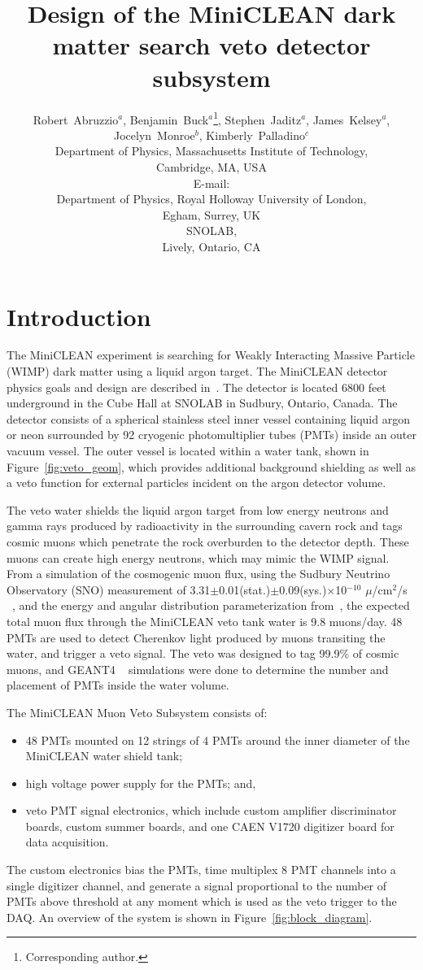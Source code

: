 \documentclass{JINST}
\title{Design of the MiniCLEAN dark matter search veto detector subsystem}
\author{Robert~Abruzzio$^a$, Benjamin~Buck$^a$\thanks{Corresponding author.}, Stephen~Jaditz$^a$, James~Kelsey$^a$, Jocelyn~Monroe$^{b}$, Kimberly~Palladino$^{c}$\\
\llap{$^a$}Department of Physics, Massachusetts Institute of Technology,\\
	Cambridge, MA, USA\\
	E-mail: \email{bbuck@mit.edu}\\
\llap{$^b$}Department of Physics, Royal Holloway University of London,\\
	Egham, Surrey, UK \\
\llap{$^c$}SNOLAB, \\ 
        Lively, Ontario, CA}
\begin{document}
\section{Introduction}
\label{Introduction}
The MiniCLEAN experiment is searching for Weakly Interacting Massive Particle
(WIMP) dark matter using a liquid argon target. The MiniCLEAN detector
physics goals and design are described in~\cite{ref:miniclean_physics}. The
detector is located 6800 feet underground in the Cube Hall at SNOLAB in
Sudbury, Ontario, Canada. The detector consists of a spherical stainless
steel inner vessel containing liquid argon or neon surrounded by 92 cryogenic
photomultiplier tubes (PMTs) inside an outer vacuum vessel. The outer vessel
is located within a water tank, shown in Figure~\ref{fig:veto_geom}, which
provides additional background shielding as well as a veto function for
external particles incident on the argon detector volume. 

The veto water shields the liquid argon target from low energy neutrons and gamma
rays produced by radioactivity in the surrounding cavern rock and tags cosmic muons
which penetrate the rock overburden to the detector depth. These muons can
create high energy neutrons, which may mimic the WIMP signal.
From a simulation of the cosmogenic muon flux, using the Sudbury Neutrino Observatory (SNO) measurement of
3.31$\pm$0.01(stat.)$\pm$0.09(sys.)$\times$10$^{-10}$ $\mu$/cm$^2$/s
~\cite{ref:sno_muon_flux}, and the energy and angular distribution
parameterization from~\cite{ref:mei_and_hime}, the expected total muon flux
through the MiniCLEAN veto tank water is 9.8 muons/day. 48 PMTs are used to
detect Cherenkov light produced by muons transiting the water, and trigger a
veto signal. The veto was designed to tag 99.9\% of cosmic muons, and GEANT4
~\cite{ref:geant4} simulations were done to determine the number and placement
of PMTs inside the water volume. 

The MiniCLEAN Muon Veto Subsystem consists of:
\begin{itemize}
\item 48 PMTs mounted on 12 strings of 4 PMTs around the inner diameter of the MiniCLEAN water shield tank;
\item high voltage power supply for the PMTs; and,
\item veto PMT signal electronics, which include custom amplifier discriminator boards, custom summer boards, and one CAEN V1720 digitizer board for data acquisition. 
\end{itemize}
The custom electronics bias the PMTs, time multiplex 8 PMT channels into a
single digitizer channel, and generate a signal proportional to the number
of PMTs above threshold at any moment which is used as the veto trigger to
the DAQ. An overview of the system is shown in
Figure~\ref{fig:block_diagram}.
\end{document}
